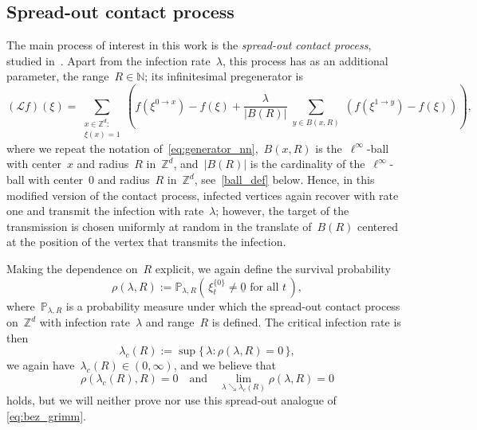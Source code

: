 \documentclass[a4paper,12pt]{article}
\newcommand{\Z}{\mathbb{Z}}
\begin{document}
\subsection{Spread-out contact process}\label{subsect_spread_out_cont_proc_def}
The main process of interest in this work is the \textit{spread-out contact process}, studied in~\cite{bds89}. Apart from the infection rate~$\lambda$, this process has as an additional parameter, the range~$R \in \mathbb{N}$; its infinitesimal pregenerator is
\begin{equation}\label{eq:generator}
(\mathcal{L}f)(\xi) = \sum_{\substack{x \in \Z^d:\\\xi(x) = 1}} \left( f(\xi^{0 \to x}) - f(\xi) + \frac{\lambda}{  |B(R)|} \sum_{\substack{y \in B(x,R)}} (f(\xi^{1 \to y}) - f(\xi))\right),
\end{equation}
where we repeat the notation of~\eqref{eq:generator_nn},~$B(x,R)$ is the~$\ell^\infty$-ball with center~$x$ and radius~$R$ in~$\Z^d$, and~$|B(R)|$ is the cardinality of the~$\ell^\infty$-ball with center~0 and radius~$R$ in~$\Z^d$, see~\eqref{ball_def} below. Hence, in this modified version of the contact process, infected vertices  again recover with rate one and transmit the infection with rate~$\lambda$; however, the target of the transmission is chosen uniformly at random in the translate of~$B(R)$ centered at the position of the vertex that transmits the infection.


\smallskip

Making the dependence on~$R$ explicit, we again define the survival probability
\begin{equation*}
\rho(\lambda,R):=\mathbb{P}_{\lambda,R}( \, \xi^{\{0\}}_t \neq \underline{0} \text{ for all }t \, ),
\end{equation*}
where~$\mathbb{P}_{\lambda,R}$ is a probability measure under which the spread-out contact process on~$\Z^d$ with infection rate~$\lambda$ and range~$R$ is defined. The critical infection rate is then
$$\lambda_c(R):= \sup\{ \, \lambda: \rho(\lambda, R) = 0 \, \},$$
we again have~$\lambda_c(R) \in (0,\infty)$, and we believe that
$$\rho(\lambda_c(R),R) = 0\quad \text{and}\quad \lim_{\lambda \searrow \lambda_c(R)}\rho(\lambda,R)=0$$
holds, but we will neither prove nor use this spread-out analogue of \eqref{eq:bez_grimm}.
\end{document}
